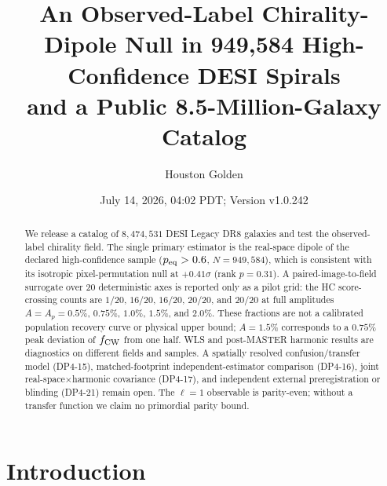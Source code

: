 \documentclass[aps,prd,twocolumn,superscriptaddress,preprintnumbers,nofootinbib,longbibliography,floatfix]{revtex4-2}
\newcommand{\sigmaunit}{\sigma}
\newcommand{\paperVersion}{v1.0.242}
\newcommand{\paperTimestamp}{July 14, 2026, 04:02 PDT}
\begin{document}
\title{An Observed-Label Chirality-Dipole Null in 949,584 High-Confidence DESI Spirals\\
and a Public 8.5-Million-Galaxy Catalog}

\author{Houston Golden}

\date{\paperTimestamp; Version \paperVersion}

\begin{abstract}
We release a catalog of $8{,}474{,}531$ DESI Legacy DR8 galaxies and test the observed-label chirality field. The single primary estimator is the real-space dipole of the declared high-confidence sample ($p_{\rm eq}>0.6$, $N=949{,}584$), which is consistent with its isotropic pixel-permutation null at $+0.41\sigmaunit$ (rank $p=0.31$). A paired-image-to-field surrogate over 20 deterministic axes is reported only as a pilot grid: the HC score-crossing counts are $1/20$, $16/20$, $16/20$, $20/20$, and $20/20$ at full amplitudes $A=A_p=0.5\%$, $0.75\%$, $1.0\%$, $1.5\%$, and $2.0\%$. These fractions are not a calibrated population recovery curve or physical upper bound; $A=1.5\%$ corresponds to a $0.75\%$ peak deviation of $f_{\rm CW}$ from one half. WLS and post-MASTER harmonic results are diagnostics on different fields and samples. A spatially resolved confusion/transfer model (DP4-15), matched-footprint independent-estimator comparison (DP4-16), joint real-space$\times$harmonic covariance (DP4-17), and independent external preregistration or blinding (DP4-21) remain open. The $\ell=1$ observable is parity-even; without a transfer function we claim no primordial parity bound.
\end{abstract}


\maketitle
\tableofcontents

\section{Introduction}
\label{sec:intro}
\end{document}
